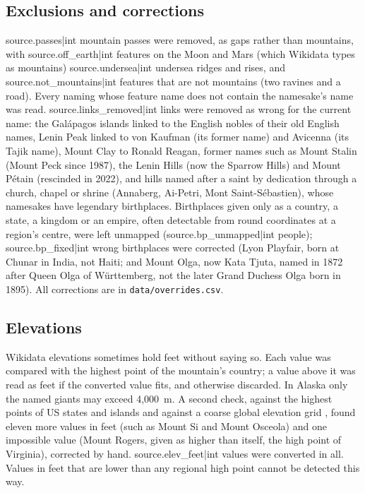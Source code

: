 \documentclass[11pt,a4paper]{article}
\begin{document}
\subsection{Exclusions and corrections}
{{source.passes|int}} mountain passes were removed, as gaps rather than mountains, with {{source.off_earth|int}} features on the Moon and Mars (which Wikidata types as mountains) {{source.undersea|int}} undersea ridges and rises, and {{source.not_mountains|int}} features that are not mountains (two ravines and a road). Every naming whose feature name does not contain the namesake's name was read. {{source.links_removed|int}} links were removed as wrong for the current name: the Gal\'apagos islands linked to the English nobles of their old English names, Lenin Peak linked to von Kaufman (its former name) and Avicenna (its Tajik name), Mount Clay to Ronald Reagan, former names such as Mount Stalin (Mount Peck since 1987), the Lenin Hills (now the Sparrow Hills) and Mount P\'etain (rescinded in 2022), and hills named after a saint by dedication through a church, chapel or shrine (Annaberg, Ai-Petri, Mont Saint-S\'ebastien), whose namesakes have legendary birthplaces. Birthplaces given only as a country, a state, a kingdom or an empire, often detectable from round coordinates at a region's centre, were left unmapped ({{source.bp_unmapped|int}} people); {{source.bp_fixed|int}} wrong birthplaces were corrected (Lyon Playfair, born at Chunar in India, not Haiti; and Mount Olga, now Kata Tjuta, named in 1872 after Queen Olga of W\"urttemberg, not the later Grand Duchess Olga born in 1895). All corrections are in \texttt{data/overrides.csv}.

\subsection{Elevations}
Wikidata elevations sometimes hold feet without saying so. Each value was compared with the highest point of the mountain's country; a value above it was read as feet if the converted value fits, and otherwise discarded. In Alaska only the named giants may exceed 4,000~m. A second check, against the highest points of US states and islands and against a coarse global elevation grid \citep{etopo5}, found eleven more values in feet (such as Mount Si and Mount Osceola) and one impossible value (Mount Rogers, given as higher than itself, the high point of Virginia), corrected by hand. {{source.elev_feet|int}} values were converted in all. Values in feet that are lower than any regional high point cannot be detected this way.
\end{document}
